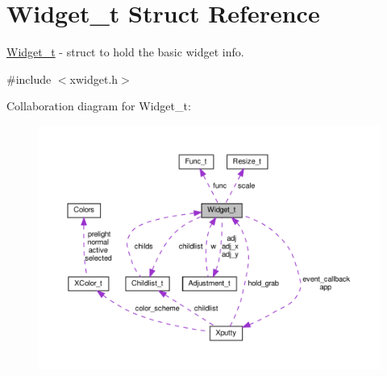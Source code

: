 \hypertarget{structWidget__t}{}\section{Widget\+\_\+t Struct Reference}
\label{structWidget__t}


\hyperlink{structWidget__t}{Widget\+\_\+t} -\/ struct to hold the basic widget info.  




{\ttfamily \#include $<$xwidget.\+h$>$}



Collaboration diagram for Widget\+\_\+t\+:
\nopagebreak
\begin{figure}[H]
\begin{center}
\leavevmode
\includegraphics[width=350pt]{structWidget__t__coll__graph}
\end{center}
\end{figure}
